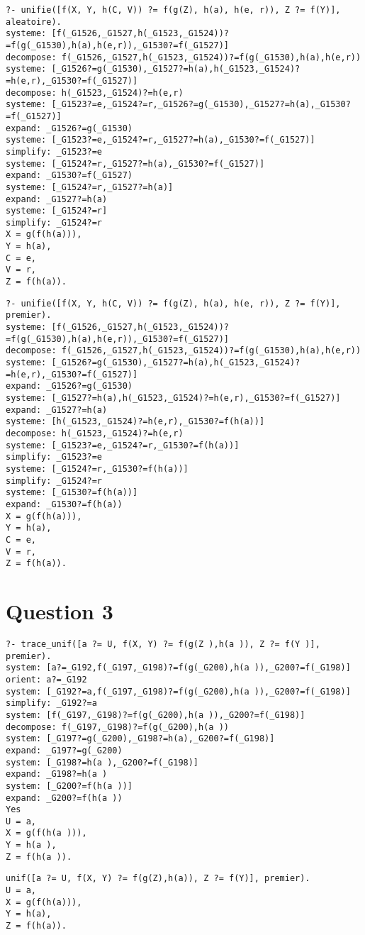\documentclass[10pt,a4paper]{report}
\begin{document}
\begin{lstlisting}[caption ={Exemple d'execution avec choix aléatoire}]
?- unifie([f(X, Y, h(C, V)) ?= f(g(Z), h(a), h(e, r)), Z ?= f(Y)], aleatoire).
systeme: [f(_G1526,_G1527,h(_G1523,_G1524))?=f(g(_G1530),h(a),h(e,r)),_G1530?=f(_G1527)]
decompose: f(_G1526,_G1527,h(_G1523,_G1524))?=f(g(_G1530),h(a),h(e,r))
systeme: [_G1526?=g(_G1530),_G1527?=h(a),h(_G1523,_G1524)?=h(e,r),_G1530?=f(_G1527)]
decompose: h(_G1523,_G1524)?=h(e,r)
systeme: [_G1523?=e,_G1524?=r,_G1526?=g(_G1530),_G1527?=h(a),_G1530?=f(_G1527)]
expand: _G1526?=g(_G1530)
systeme: [_G1523?=e,_G1524?=r,_G1527?=h(a),_G1530?=f(_G1527)]
simplify: _G1523?=e
systeme: [_G1524?=r,_G1527?=h(a),_G1530?=f(_G1527)]
expand: _G1530?=f(_G1527)
systeme: [_G1524?=r,_G1527?=h(a)]
expand: _G1527?=h(a)
systeme: [_G1524?=r]
simplify: _G1524?=r
X = g(f(h(a))),
Y = h(a),
C = e,
V = r,
Z = f(h(a)).
\end{lstlisting}

\begin{lstlisting}[caption ={Exemple d'execution avec comme choix le premier}]
?- unifie([f(X, Y, h(C, V)) ?= f(g(Z), h(a), h(e, r)), Z ?= f(Y)], premier).
systeme: [f(_G1526,_G1527,h(_G1523,_G1524))?=f(g(_G1530),h(a),h(e,r)),_G1530?=f(_G1527)]
decompose: f(_G1526,_G1527,h(_G1523,_G1524))?=f(g(_G1530),h(a),h(e,r))
systeme: [_G1526?=g(_G1530),_G1527?=h(a),h(_G1523,_G1524)?=h(e,r),_G1530?=f(_G1527)]
expand: _G1526?=g(_G1530)
systeme: [_G1527?=h(a),h(_G1523,_G1524)?=h(e,r),_G1530?=f(_G1527)]
expand: _G1527?=h(a)
systeme: [h(_G1523,_G1524)?=h(e,r),_G1530?=f(h(a))]
decompose: h(_G1523,_G1524)?=h(e,r)
systeme: [_G1523?=e,_G1524?=r,_G1530?=f(h(a))]
simplify: _G1523?=e
systeme: [_G1524?=r,_G1530?=f(h(a))]
simplify: _G1524?=r
systeme: [_G1530?=f(h(a))]
expand: _G1530?=f(h(a))
X = g(f(h(a))),
Y = h(a),
C = e,
V = r,
Z = f(h(a)).
\end{lstlisting}

\chapter*{Question 3}

\begin{lstlisting}[caption ={Exemple d'execution avec un niveau de debug}]
?- trace_unif([a ?= U, f(X, Y) ?= f(g(Z ),h(a )), Z ?= f(Y )], premier).
system: [a?=_G192,f(_G197,_G198)?=f(g(_G200),h(a )),_G200?=f(_G198)]
orient: a?=_G192
system: [_G192?=a,f(_G197,_G198)?=f(g(_G200),h(a )),_G200?=f(_G198)]
simplify: _G192?=a
system: [f(_G197,_G198)?=f(g(_G200),h(a )),_G200?=f(_G198)]
decompose: f(_G197,_G198)?=f(g(_G200),h(a ))
system: [_G197?=g(_G200),_G198?=h(a),_G200?=f(_G198)]
expand: _G197?=g(_G200)
system: [_G198?=h(a ),_G200?=f(_G198)]
expand: _G198?=h(a )
system: [_G200?=f(h(a ))]
expand: _G200?=f(h(a ))
Yes
U = a,
X = g(f(h(a ))),
Y = h(a ),
Z = f(h(a )).
\end{lstlisting}

\begin{lstlisting}[caption ={Exemple d'execution }]
unif([a ?= U, f(X, Y) ?= f(g(Z),h(a)), Z ?= f(Y)], premier).
U = a,
X = g(f(h(a))),
Y = h(a),
Z = f(h(a)).
\end{lstlisting}
\end{document}
